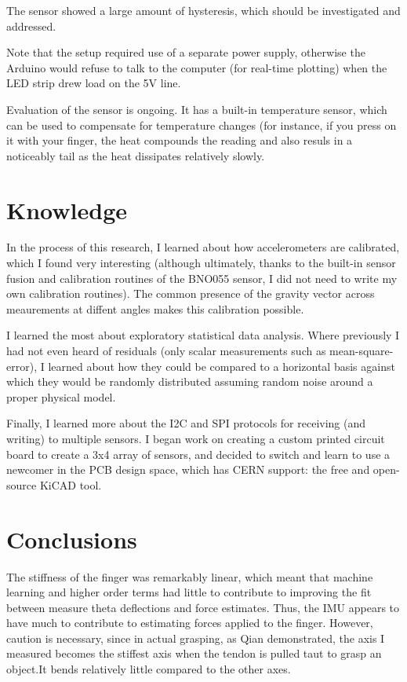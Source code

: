 \documentclass[preprint,12pt,3p]{elsarticle}
\begin{document}
The sensor showed a large amount of hysteresis, which should be investigated and addressed.

Note that the setup required use of a separate power supply, otherwise the Arduino would refuse to talk to the
computer (for real-time plotting) when the LED strip drew load on the 5V line.

Evaluation of the sensor is ongoing. It has a built-in temperature sensor, which
can be used to compensate for temperature changes (for instance, if you press on
it with your finger, the heat compounds the reading and also resuls in a
noticeably tail as the heat dissipates relatively slowly.

\section{Knowledge}

In the process of this research, I learned about how accelerometers are calibrated, which I found
very interesting (although ultimately, thanks to the built-in sensor fusion and calibration routines of the BNO055
sensor, I did not need to write my own calibration routines). The common presence of the gravity
vector across meaurements at diffent angles makes this calibration possible.

I learned the most about exploratory statistical data analysis. Where previously I had not even
heard of residuals (only scalar measurements such as mean-square-error), I learned about how they
could be compared to a horizontal basis against which they would be randomly distributed assuming
random noise around a proper physical model.

Finally, I learned more about the I2C and SPI protocols for receiving (and writing) to multiple
sensors. I began work on creating a custom printed circuit board to create a 3x4 array of sensors,
and decided to switch and learn to use a newcomer in the PCB design space, which has CERN support: the free and open-source
KiCAD tool.

\section{Conclusions}

The stiffness of the finger was remarkably linear, which meant that machine learning and higher
order terms had little to contribute to improving the fit between measure theta deflections and
force estimates. Thus, the IMU appears to have much to contribute to estimating forces applied to
the finger. However, caution is necessary, since in actual grasping, as Qian demonstrated, the
axis I measured becomes the stiffest axis when the tendon is pulled taut to grasp an object.It bends
relatively little compared to the other axes.
\end{document}
